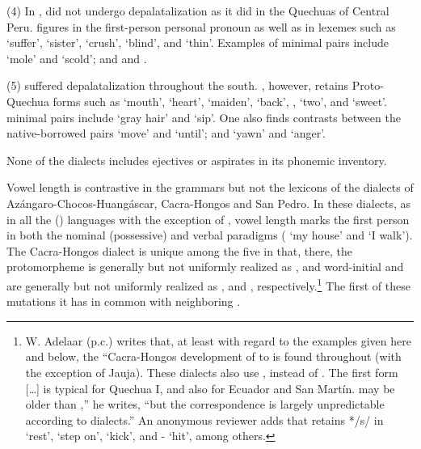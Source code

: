 (4) In \SYQ, \textipa{[ň]} did not undergo depalatalization as it did in the Quechuas of Central Peru. \textipa{[ň]} figures in the first-person personal pronoun  as well as in lexemes such as  ‘suffer’,  ‘sister’,  ‘crush’,  ‘blind’, and  ‘thin’. Examples of \textipa{[n]/[ň]} minimal pairs include  ‘mole’ and  ‘scold’; and   and  . 

(5) \textipa{[š]} suffered depalatalization throughout the south. \SYQ, however, retains Proto-Quechua forms such as  ‘mouth’,  ‘heart’,  ‘maiden’,  ‘back’, , ‘two’, and  ‘sweet’. \textipa{[s]/[š]} minimal pairs include  ‘gray hair’ and  ‘sip’. One also finds contrasts between the native-borrowed pairs  ‘move’ and  ‘until’; and  ‘yawn’ and  ‘anger’.

None of the dialects includes ejectives or aspirates in its phonemic inventory.
 
Vowel length is contrastive in the grammars but not the lexicons of the dialects of Azángaro-Chocos-Huangáscar, Cacra-Hongos and San Pedro. In these dialects, as in all the \QI{} (\QB) languages with the exception of , vowel length marks the first person in both the nominal (possessive) and verbal paradigms ( ‘my house’ and  ‘I walk’). The Cacra-Hongos dialect is unique among the five in that, there, the protomorpheme  is generally but not uniformly realized as \textipa{[l]}, and word-initial  and  are generally but not uniformly realized as \textipa{[h]}, and \textipa{[š]}, respectively.\footnote{W. Adelaar (p.c.) writes that, at least with regard to the examples given here and below, the “Cacra-Hongos development of  to  is found throughout  (with the exception of Jauja). These dialects also use , instead of . The first form [\dots] is typical for Quechua I, and also for Ecuador and San Martín.  may be older than ,” he writes, “but the correspondence is largely unpredictable according to dialects.” An anonymous reviewer adds that  retains */s/ in  ‘rest’,  ‘step on’,  ‘kick’, and - ‘hit’, among others.} The first of these mutations it has in common with neighboring . 

